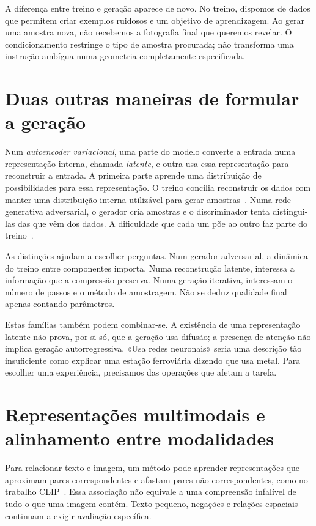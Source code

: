 A diferença entre treino e geração aparece de novo. No treino, dispomos de dados que permitem criar exemplos ruidosos e um objetivo de aprendizagem. Ao gerar uma amostra nova, não recebemos a fotografia final que queremos revelar. O condicionamento restringe o tipo de amostra procurada; não transforma uma instrução ambígua numa geometria completamente especificada.

\section{Duas outras maneiras de formular a geração}
Num \emph{autoencoder variacional}, uma parte do modelo converte a entrada numa representação interna, chamada \emph{latente}, e outra usa essa representação para reconstruir a entrada. A primeira parte aprende uma distribuição de possibilidades para essa representação. O treino concilia reconstruir os dados com manter uma distribuição interna utilizável para gerar amostras~\citep{kingma2014}. Numa rede generativa adversarial, o gerador cria amostras e o discriminador tenta distingui-las das que vêm dos dados. A dificuldade que cada um põe ao outro faz parte do treino~\citep{gan2014}.

As distinções ajudam a escolher perguntas. Num gerador adversarial, a dinâmica do treino entre componentes importa. Numa reconstrução latente, interessa a informação que a compressão preserva. Numa geração iterativa, interessam o número de passos e o método de amostragem. Não se deduz qualidade final apenas contando parâmetros.

Estas famílias também podem combinar-se. A existência de uma representação latente não prova, por si só, que a geração usa difusão; a presença de atenção não implica geração autorregressiva. «Usa redes neuronais» seria uma descrição tão insuficiente como explicar uma estação ferroviária dizendo que usa metal. Para escolher uma experiência, precisamos das operações que afetam a tarefa.

\section{Representações multimodais e alinhamento entre modalidades}
Para relacionar texto e imagem, um método pode aprender representações que aproximam pares correspondentes e afastam pares não correspondentes, como no trabalho CLIP~\citep{radford2021clip}. Essa associação não equivale a uma compreensão infalível de tudo o que uma imagem contém. Texto pequeno, negações e relações espaciais continuam a exigir avaliação específica.

